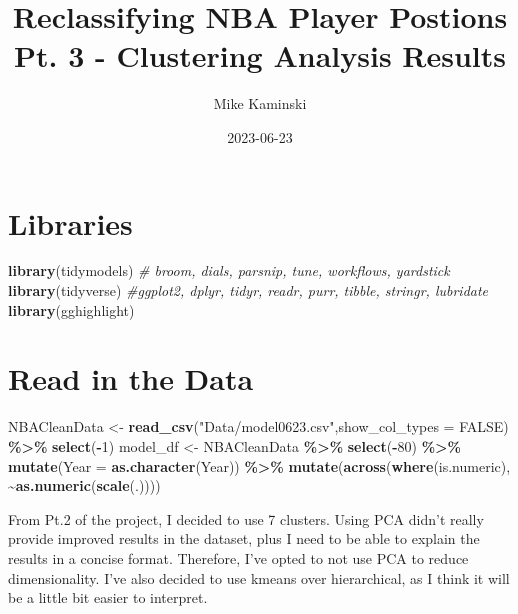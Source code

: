 \documentclass[
]{article}
\title{Reclassifying NBA Player Postions Pt. 3 - Clustering Analysis
Results}
\author{Mike Kaminski}
\date{2023-06-23}
\newenvironment{Shaded}{\begin{snugshade}}{\end{snugshade}}
\newcommand{\AttributeTok}[1]{\textcolor[rgb]{0.13,0.29,0.53}{#1}}
\newcommand{\CommentTok}[1]{\textcolor[rgb]{0.56,0.35,0.01}{\textit{#1}}}
\newcommand{\ConstantTok}[1]{\textcolor[rgb]{0.56,0.35,0.01}{#1}}
\newcommand{\DecValTok}[1]{\textcolor[rgb]{0.00,0.00,0.81}{#1}}
\newcommand{\FunctionTok}[1]{\textcolor[rgb]{0.13,0.29,0.53}{\textbf{#1}}}
\newcommand{\NormalTok}[1]{#1}
\newcommand{\OtherTok}[1]{\textcolor[rgb]{0.56,0.35,0.01}{#1}}
\newcommand{\SpecialCharTok}[1]{\textcolor[rgb]{0.81,0.36,0.00}{\textbf{#1}}}
\newcommand{\StringTok}[1]{\textcolor[rgb]{0.31,0.60,0.02}{#1}}
\begin{document}
\maketitle

\hypertarget{libraries}{%
\section{Libraries}\label{libraries}}

\begin{Shaded}
\begin{Highlighting}[]
\FunctionTok{library}\NormalTok{(tidymodels) }\CommentTok{\# broom, dials, parsnip, tune, workflows, yardstick}
\FunctionTok{library}\NormalTok{(tidyverse) }\CommentTok{\#ggplot2, dplyr, tidyr, readr, purr, tibble, stringr, lubridate}
\FunctionTok{library}\NormalTok{(gghighlight)}
\end{Highlighting}
\end{Shaded}

\hypertarget{read-in-the-data}{%
\section{Read in the Data}\label{read-in-the-data}}

\begin{Shaded}
\begin{Highlighting}[]
\NormalTok{NBACleanData }\OtherTok{\textless{}{-}} \FunctionTok{read\_csv}\NormalTok{(}\StringTok{"Data/model0623.csv"}\NormalTok{,}\AttributeTok{show\_col\_types =} \ConstantTok{FALSE}\NormalTok{) }\SpecialCharTok{\%\textgreater{}\%} \FunctionTok{select}\NormalTok{(}\SpecialCharTok{{-}}\DecValTok{1}\NormalTok{)}
\NormalTok{model\_df }\OtherTok{\textless{}{-}}\NormalTok{  NBACleanData }\SpecialCharTok{\%\textgreater{}\%} \FunctionTok{select}\NormalTok{(}\SpecialCharTok{{-}}\DecValTok{80}\NormalTok{) }\SpecialCharTok{\%\textgreater{}\%}
  \FunctionTok{mutate}\NormalTok{(}\AttributeTok{Year =} \FunctionTok{as.character}\NormalTok{(Year)) }\SpecialCharTok{\%\textgreater{}\%}
  \FunctionTok{mutate}\NormalTok{(}\FunctionTok{across}\NormalTok{(}\FunctionTok{where}\NormalTok{(is.numeric), }\SpecialCharTok{\textasciitilde{}}\FunctionTok{as.numeric}\NormalTok{(}\FunctionTok{scale}\NormalTok{(.))))}
\end{Highlighting}
\end{Shaded}

From Pt.2 of the project, I decided to use 7 clusters. Using PCA didn't
really provide improved results in the dataset, plus I need to be able
to explain the results in a concise format. Therefore, I've opted to not
use PCA to reduce dimensionality. I've also decided to use kmeans over
hierarchical, as I think it will be a little bit easier to interpret.
\end{document}
